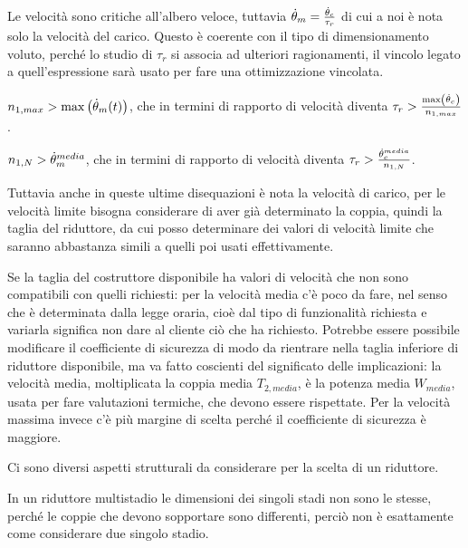 Le velocità sono critiche all'albero veloce, tuttavia $\dot{\theta}_m=\frac{\dot{\theta}_c}{\tau_r}$ di cui a noi è nota solo la velocità del carico. Questo è coerente con il tipo di dimensionamento voluto, perché lo studio di $\tau_r$ si associa ad ulteriori ragionamenti, il vincolo legato a quell'espressione sarà usato per fare una ottimizzazione vincolata.

$n_{1,max}>\operatorname{max}\left(\dot{\theta}_m(t)\right)$, che in termini di rapporto di velocità diventa $\tau_r>\frac{\operatorname{max}\left(\dot{\theta}_c\right)}{n_{1,max}}$.

$n_{1,N}>\dot{\theta}_m^{media}$, che in termini di rapporto di velocità diventa $\tau_r > \frac{\dot{\theta}_c^{media}}{n_{1,N}}$.

Tuttavia anche in queste ultime disequazioni è nota la velocità di carico, per le velocità limite bisogna considerare di aver già determinato la coppia, quindi la taglia del riduttore, da cui posso determinare dei valori di velocità limite che saranno abbastanza simili a quelli poi usati effettivamente.

Se la taglia del costruttore disponibile ha valori di velocità che non sono compatibili con quelli richiesti: per la velocità media c'è poco da fare, nel senso che è determinata dalla legge oraria, cioè dal tipo di funzionalità richiesta e variarla significa non dare al cliente ciò che ha richiesto.
Potrebbe essere possibile modificare il coefficiente di sicurezza di modo da rientrare nella taglia inferiore di riduttore disponibile, ma va fatto coscienti del significato delle implicazioni: la velocità media, moltiplicata la coppia media $T_{2,media}$, è la potenza media $W_{media}$, usata per fare valutazioni termiche, che devono essere rispettate.
Per la velocità massima invece c'è più margine di scelta perché il coefficiente di sicurezza è maggiore. \label{rivalutazione_coeff_sic}

Ci sono diversi aspetti strutturali da considerare per la scelta di un riduttore.

In un riduttore multistadio le dimensioni dei singoli stadi non sono le stesse, perché le coppie che devono sopportare sono differenti, perciò non è esattamente come considerare due singolo stadio.

